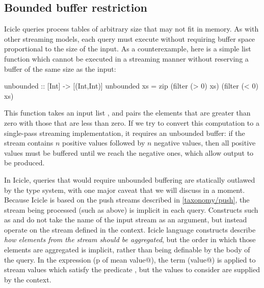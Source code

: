 \subsection{Bounded buffer restriction}
\label{icicle:s:IcicleSource:bounded}
Icicle queries process tables of arbitrary size that may not fit in memory.
As with other streaming models, each query must execute without requiring buffer space proportional to the size of the input.
As a counterexample, here is a simple list function which cannot be executed in a streaming manner without reserving a buffer of the same size as the input:
\begin{haskell}
unbounded :: [Int] -> [(Int,Int)]
unbounded xs = zip (filter (> 0) xs) (filter (< 0) xs)
\end{haskell}

This function takes an input list \Ic@xs@, and pairs the elements that are greater than zero with those that are less than zero.
If we try to convert this computation to a single-pass streaming implementation, it requires an unbounded buffer: if the stream contains $n$ positive values followed by $n$ negative values, then all positive values must be buffered until we reach the negative ones, which allow output to be produced.


In Icicle, queries that would require unbounded buffering are statically outlawed by the type system, with one major caveat that we will discuss in a moment.
Because Icicle is based on the push streams described in \cref{taxonomy/push}, the stream being processed (such as \Ic@xs@ above) is implicit in each query.
Constructs such as \Ic@filter@ and \Ic@fold@ do not take the name of the input stream as an argument, but instead operate on the stream defined in the context.
Icicle language constructs describe \emph{how elements from the stream should be aggregated}, but the order in which those elements are aggregated is implicit, rather than being definable by the body of the query.
In the expression (\Ic@filter p of mean value@), the term (\Ic@mean value@) is applied to stream values which satisfy the predicate \Ic@p@, but the values to consider are supplied by the context.

